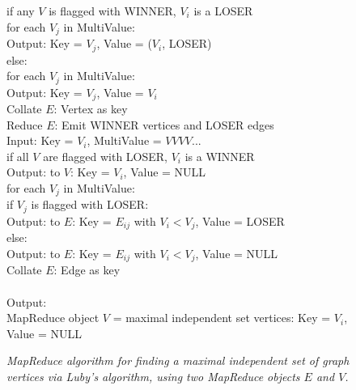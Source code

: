 \begin{figure}[htb]
\begin{center}
{\begin{minipage}{\textwidth}
\begin{tabbing}
       \> \> if any $V$ is flagged with WINNER, $V_i$ is a LOSER \\
       \> \> \> for each $V_j$ in MultiValue: \\
       \> \> \> \> Output: Key = $V_j$, Value = ($V_i$, LOSER) \\
       \> \> else: \\
       \> \> \> for each $V_j$ in MultiValue: \\
       \> \> \> \> Output: Key = $V_j$, Value = $V_i$ \\
 Collate $E$: Vertex as key \\
 Reduce $E$: Emit WINNER vertices and LOSER edges \\
       \> \> Input: Key = $V_i$, MultiValue = $V V V V ...$ \\
       \> \> if all $V$ are flagged with LOSER, $V_i$ is a WINNER \\
       \> \> \> Output: to $V$: Key = $V_i$, Value = NULL \\
       \> \> for each $V_j$ in MultiValue: \\
       \> \> \> if $V_j$ is flagged with LOSER: \\
       \> \> \> \> Output: to $E$: Key = $E_{ij}$ with $V_i < V_j$, Value = LOSER \\
       \> \> \> else: \\
       \> \> \> \> Output: to $E$: Key = $E_{ij}$ with $V_i < V_j$, Value = NULL \\
 Collate $E$: Edge as key \\
\\
Output: \\
\> MapReduce object $V$ = maximal independent set vertices: Key = $V_i$, Value = NULL 
  \end{tabbing}
 \end{minipage}}\end{center}

 \caption{\it MapReduce algorithm for finding a maximal independent
 set of graph vertices via Luby's algorithm, using two MapReduce
 objects $E$ and $V$.}

 \label{fig:luby}
\end{figure}

